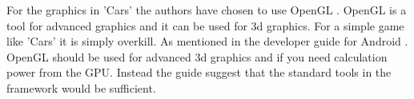 For the graphics in 'Cars' the authors have chosen to use OpenGL \cite{opengl}.
OpenGL is a tool for advanced graphics and it can be used for 3d graphics.
For a simple game like 'Cars' it is simply overkill.
As mentioned in the developer guide for Android \cite{android_opengl}.
OpenGL should be used for advanced 3d graphics and if you need calculation power from the GPU.
Instead the guide suggest that the standard tools in the framework would be sufficient.
